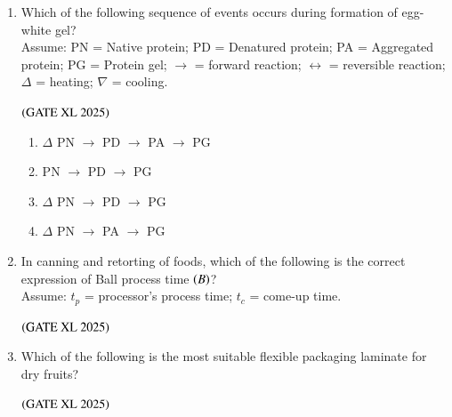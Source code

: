 \documentclass[journal]{IEEEtran}
\begin{document}
\begin{enumerate}
    \item Which of the following sequence of events occurs during formation of egg-white gel?\\
    Assume: PN = Native protein; PD = Denatured protein; PA = Aggregated protein; PG = Protein gel; $\rightarrow$ = forward reaction; $\leftrightarrow$ = reversible reaction; $\Delta$ = heating; $\nabla$ = cooling.

    \hfill $\left(\text{GATE XL 2025}\right)$
    \begin{enumerate}
        \item $\Delta$ PN $\rightarrow$ PD $\rightarrow$ PA $\rightarrow$ PG
        \item PN $\rightarrow$ PD $\rightarrow$ PG
        \item $\Delta$ PN $\rightarrow$ PD $\rightarrow$ PG
        \item $\Delta$ PN $\rightarrow$ PA $\rightarrow$ PG
    \end{enumerate}

    \item In canning and retorting of foods, which of the following is the correct expression of Ball process time $\left(B\right)$?\\
    Assume: $t_p$ = processor's process time; $t_c$ = come-up time.

    \hfill $\left(\text{GATE XL 2025}\right)$
    \begin{enumerate}
    \end{enumerate}

    \item Which of the following is the most suitable flexible packaging laminate for dry fruits?

    \hfill $\left(\text{GATE XL 2025}\right)$
    \begin{enumerate}
    \end{enumerate}


\end{enumerate}
\end{document}
